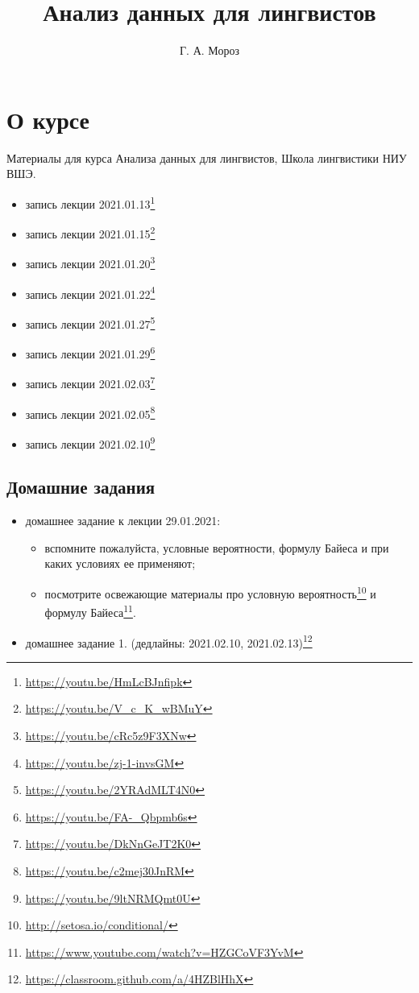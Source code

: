 \documentclass[
]{book}
\title{Анализ данных для лингвистов}
\author{Г. А. Мороз}
\date{}
\providecommand{\tightlist}{%
  \setlength{\itemsep}{0pt}\setlength{\parskip}{0pt}}
\renewcommand{\href}[2]{#2\footnote{\url{#1}}}
\begin{document}
\maketitle

{
\setcounter{tocdepth}{1}
\tableofcontents
}
\hypertarget{ux43e-ux43aux443ux440ux441ux435}{%
\chapter{О курсе}\label{ux43e-ux43aux443ux440ux441ux435}}

Материалы для курса Анализа данных для лингвистов, Школа лингвистики НИУ ВШЭ.

\begin{itemize}
\tightlist
\item
  \href{https://youtu.be/HmLcBJnfipk}{запись лекции 2021.01.13}
\item
  \href{https://youtu.be/V_c_K_wBMuY}{запись лекции 2021.01.15}
\item
  \href{https://youtu.be/cRc5z9F3XNw}{запись лекции 2021.01.20}
\item
  \href{https://youtu.be/zj-1-invsGM}{запись лекции 2021.01.22}
\item
  \href{https://youtu.be/2YRAdMLT4N0}{запись лекции 2021.01.27}
\item
  \href{https://youtu.be/FA-_Qbpmb6s}{запись лекции 2021.01.29}
\item
  \href{https://youtu.be/DkNnGeJT2K0}{запись лекции 2021.02.03}
\item
  \href{https://youtu.be/c2mej30JnRM}{запись лекции 2021.02.05}
\item
  \href{https://youtu.be/9ltNRMQmt0U}{запись лекции 2021.02.10}
\end{itemize}

\hypertarget{ux434ux43eux43cux430ux448ux43dux438ux435-ux437ux430ux434ux430ux43dux438ux44f}{%
\section{Домашние задания}\label{ux434ux43eux43cux430ux448ux43dux438ux435-ux437ux430ux434ux430ux43dux438ux44f}}

\begin{itemize}
\tightlist
\item
  домашнее задание к лекции 29.01.2021:

  \begin{itemize}
  \tightlist
  \item
    вспомните пожалуйста, условные вероятности, формулу Байеса и при каких условиях ее применяют;
  \item
    посмотрите освежающие материалы про \href{http://setosa.io/conditional/}{условную вероятность} и \href{https://www.youtube.com/watch?v=HZGCoVF3YvM}{формулу Байеса}.
  \end{itemize}
\item
  \href{https://classroom.github.com/a/4HZBlHhX}{домашнее задание 1. (дедлайны: 2021.02.10, 2021.02.13)}
\end{itemize}
\end{document}
